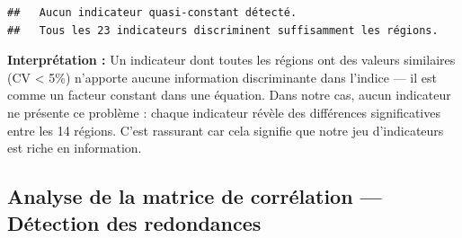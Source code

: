\documentclass[
]{article}
\newenvironment{Shaded}{\begin{snugshade}}{\end{snugshade}}
\newcommand{\ControlFlowTok}[1]{\textcolor[rgb]{0.13,0.29,0.53}{\textbf{#1}}}
\newcommand{\DecValTok}[1]{\textcolor[rgb]{0.00,0.00,0.81}{#1}}
\newcommand{\FunctionTok}[1]{\textcolor[rgb]{0.13,0.29,0.53}{\textbf{#1}}}
\newcommand{\NormalTok}[1]{#1}
\newcommand{\OtherTok}[1]{\textcolor[rgb]{0.56,0.35,0.01}{#1}}
\newcommand{\SpecialCharTok}[1]{\textcolor[rgb]{0.81,0.36,0.00}{\textbf{#1}}}
\newcommand{\StringTok}[1]{\textcolor[rgb]{0.31,0.60,0.02}{#1}}
\begin{document}
\begin{Shaded}
\end{Shaded}

\begin{verbatim}
##   Aucun indicateur quasi-constant détecté.
##   Tous les 23 indicateurs discriminent suffisamment les régions.
\end{verbatim}

\textbf{Interprétation :} Un indicateur dont toutes les régions ont des
valeurs similaires (CV \textless{} 5\%) n'apporte aucune information
discriminante dans l'indice --- il est comme un facteur constant dans
une équation. Dans notre cas, aucun indicateur ne présente ce problème :
chaque indicateur révèle des différences significatives entre les 14
régions. C'est rassurant car cela signifie que notre jeu d'indicateurs
est riche en information.

\subsection{Analyse de la matrice de corrélation --- Détection des
redondances}\label{analyse-de-la-matrice-de-corruxe9lation-duxe9tection-des-redondances}
\end{document}
